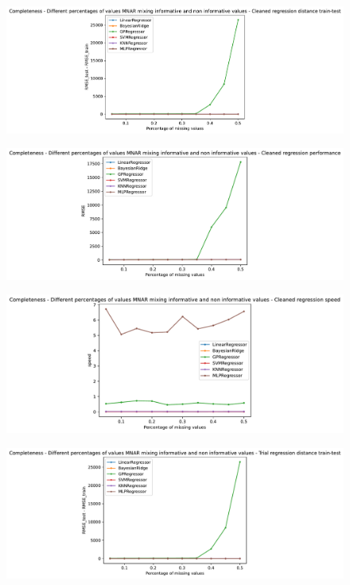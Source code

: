 \documentclass{Configuration_Files/PoliMi3i_thesis}
\begin{document}
\newpage
\begin{figure}[H]
    \centering
    \includegraphics[scale=0.55]{Images/completeness/4.pdf}  
\end{figure}
\begin{figure}[H]
    \centering
    \includegraphics[scale=0.55]{Images/completeness/5.pdf}  
\end{figure}
\begin{figure}[H]
    \centering
    \includegraphics[scale=0.6]{Images/completeness/6.pdf}  
\end{figure}
\begin{figure}[H]
    \centering
    \includegraphics[scale=0.6]{Images/completeness/7.pdf}
\end{figure}
\end{document}
